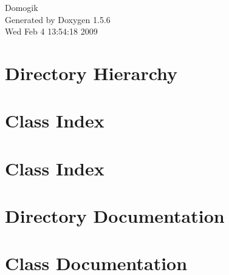 \documentclass[a4paper]{book}
\begin{document}
\begin{titlepage}
\vspace*{7cm}
\begin{center}
{\Large Domogik }\\
\vspace*{1cm}
{\large Generated by Doxygen 1.5.6}\\
\vspace*{0.5cm}
{\small Wed Feb 4 13:54:18 2009}\\
\end{center}
\end{titlepage}
\clearemptydoublepage
{}
\tableofcontents
\clearemptydoublepage
{}
\chapter{Directory Hierarchy}

\chapter{Class Index}

\chapter{Class Index}

\chapter{Directory Documentation}



\chapter{Class Documentation}



















\printindex
\end{document}
